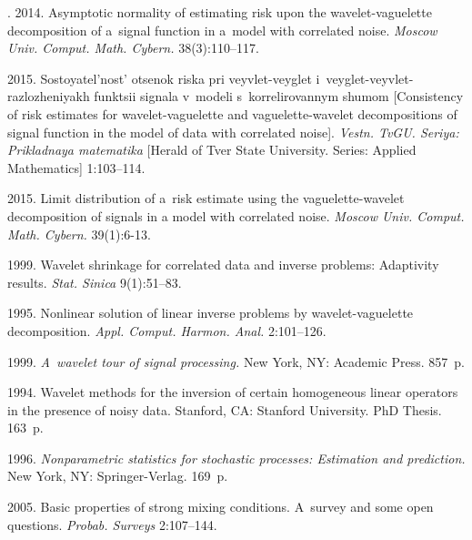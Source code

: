 \begin{multicols}{2}
{{\begin{thebibliography}{99}
. 2014. Asymptotic normality of 
estimating risk upon the wavelet-vaguelette decomposition of a~signal function 
in a~model with correlated noise. \textit{Moscow Univ. Comput. Math.  Cybern.} 
38(3):110--117.

 2015. Sostoyatel'nost' otsenok riska pri veyvlet-veyglet 
i~veyglet-veyvlet-razlozheniyakh funktsii signala v~modeli s~korrelirovannym shumom 
[Consistency of risk estimates for wavelet-vaguelette and vaguelette-wavelet 
decompositions of signal function in the model of data with correlated noise]. 
\textit{Vestn. TvGU. Seriya: Prikladnaya matematika} 
[Herald of Tver State University. Series: Applied Mathematics] 1:103--114.

 2015. 
Limit distribution of a~risk estimate using the vaguelette-wavelet decomposition 
of signals in a model with correlated noise. 
\textit{Moscow Univ. Comput. Math. Cybern.} 39(1):6-13.



 1999. Wavelet shrinkage for correlated data and inverse
 problems: Adaptivity results. \textit{Stat. Sinica} 9(1):51--83.

 1995. Nonlinear solution of linear inverse problems by 
wavelet-vaguelette decomposition. \textit{Appl. Comput. Harmon. Anal.}  
2:101--126.


 1999. \textit{A~wavelet tour of signal processing.} 
New York, NY: Academic Press. 857~p.

 1994. Wavelet methods for the inversion of certain homogeneous 
linear operators in the presence of noisy data. Stanford, CA: Stanford University. 
PhD Thesis. 163~p.

 1996. \textit{Nonparametric statistics for stochastic processes: 
Estimation and prediction.} New York, NY: Springer-Verlag. 169~p.

 2005. Basic properties of strong mixing conditions. 
A~survey and some open questions. \textit{Probab. Surveys} 2:107--144.
\end{thebibliography}

 }
 }

\end{multicols}

